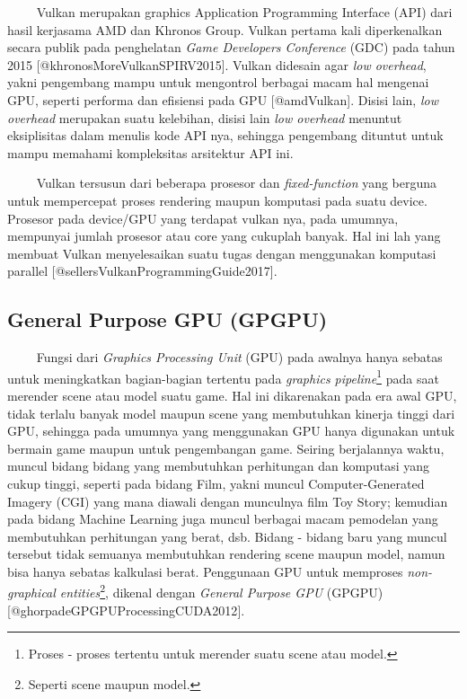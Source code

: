    Vulkan merupakan graphics Application Programming Interface (API)
dari hasil kerjasama AMD dan Khronos Group. Vulkan pertama kali
diperkenalkan secara publik pada penghelatan \emph{Game Developers
Conference} (GDC) pada tahun 2015 {[}@khronosMoreVulkanSPIRV2015{]}.
Vulkan didesain agar \emph{low overhead}, yakni pengembang mampu untuk
mengontrol berbagai macam hal mengenai GPU, seperti performa dan
efisiensi pada GPU {[}@amdVulkan{]}. Disisi lain, \emph{low overhead}
merupakan suatu kelebihan, disisi lain \emph{low overhead} menuntut
eksiplisitas dalam menulis kode API nya, sehingga pengembang dituntut
untuk mampu memahami kompleksitas arsitektur API ini.

   Vulkan tersusun dari beberapa prosesor dan \emph{fixed-function} yang
berguna untuk mempercepat proses rendering maupun komputasi pada suatu
device. Prosesor pada device/GPU yang terdapat vulkan nya, pada umumnya,
mempunyai jumlah prosesor atau core yang cukuplah banyak. Hal ini lah
yang membuat Vulkan menyelesaikan suatu tugas dengan menggunakan
komputasi parallel {[}@sellersVulkanProgrammingGuide2017{]}.

\hypertarget{general-purpose-gpu-gpgpu}{%
\subsection{General Purpose GPU
(GPGPU)}\label{general-purpose-gpu-gpgpu}}

   Fungsi dari \emph{Graphics Processing Unit} (GPU) pada awalnya hanya
sebatas untuk meningkatkan bagian-bagian tertentu pada \emph{graphics
pipeline}\footnote{Proses - proses tertentu untuk merender suatu scene
  atau model.} pada saat merender scene atau model suatu game. Hal ini
dikarenakan pada era awal GPU, tidak terlalu banyak model maupun scene
yang membutuhkan kinerja tinggi dari GPU, sehingga pada umumnya yang
menggunakan GPU hanya digunakan untuk bermain game maupun untuk
pengembangan game. Seiring berjalannya waktu, muncul bidang bidang yang
membutuhkan perhitungan dan komputasi yang cukup tinggi, seperti pada
bidang Film, yakni muncul Computer-Generated Imagery (CGI) yang mana
diawali dengan munculnya film Toy Story; kemudian pada bidang Machine
Learning juga muncul berbagai macam pemodelan yang membutuhkan
perhitungan yang berat, dsb. Bidang - bidang baru yang muncul tersebut
tidak semuanya membutuhkan rendering scene maupun model, namun bisa
hanya sebatas kalkulasi berat. Penggunaan GPU untuk memproses
\emph{non-graphical entities}\footnote{Seperti scene maupun model.},
dikenal dengan \emph{General Purpose GPU} (GPGPU)
{[}@ghorpadeGPGPUProcessingCUDA2012{]}.

